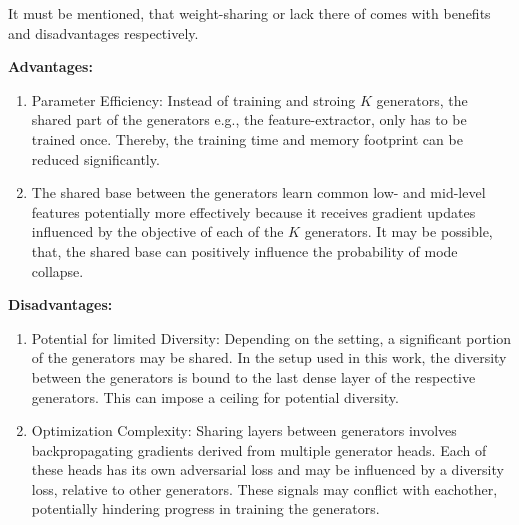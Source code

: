 It must be mentioned, that weight-sharing or lack there of comes with benefits and disadvantages respectively. 

\noindent\textbf{Advantages:}
\begin{enumerate}
    \item Parameter Efficiency: Instead of training and stroing $K$ generators, the shared part of the generators e.g., the feature-extractor, only has to be trained once. Thereby, the training time and memory footprint can be reduced significantly. 
    \item The shared base between the generators learn common low- and mid-level features potentially more effectively because it receives gradient updates influenced by the objective of each of the $K$ generators. It may be possible, that, the shared base can positively influence the probability of mode collapse.
\end{enumerate}

\noindent\textbf{Disadvantages:}
\begin{enumerate}
    \item Potential for limited Diversity: Depending on the setting, a significant portion of the generators may be shared. In the setup used in this work, the diversity between the generators is bound to the last dense layer of the respective generators. This can impose a ceiling for potential diversity. 
    \item Optimization Complexity: Sharing layers between generators involves backpropagating gradients derived from multiple generator heads. Each of these heads has its own adversarial loss and may be influenced by a diversity loss, relative to other generators. These signals may conflict with eachother, potentially hindering progress in training the generators. 
\end{enumerate}





